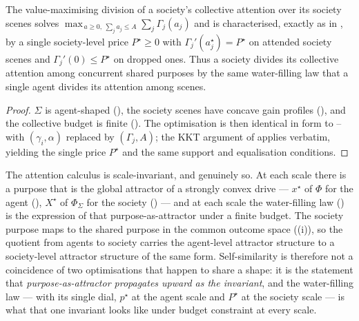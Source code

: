 \documentclass[11pt,twocolumn,a4paper]{article}
\newcommand{\drive}{\Phi}            %
\newcommand{\Purp}{x^{\star}}        %
\newcommand{\att}{\alpha}            %
\newcommand{\price}{p^{\star}}       %
\newcommand{\Soc}{\Sigma}            %
\begin{document}
\begin{theorem}
\label{thm:socwaterfill}
The value-maximising division of a society's collective attention over its
society scenes solves $\max_{\,a\ge0,\ \sum_j a_j\le A}\sum_j\Gamma_j(a_j)$
and is characterised, exactly as in , by a single
society-level price $P^\star\ge0$ with $\Gamma_j'(a_j^\star)=P^\star$ on
attended society scenes and $\Gamma_j'(0)\le P^\star$ on dropped ones.
Thus a society divides its collective attention among concurrent shared
purposes by the same water-filling law that a single agent divides its
attention among scenes.
\end{theorem}

\begin{proof}
$\Soc$ is agent-shaped (), the society scenes have
concave gain profiles (), and the collective budget is
finite (). The optimisation is then identical in form
to -- with $(\gamma_i,\att)$ replaced
by $(\Gamma_j,A)$; the KKT argument of  applies
verbatim, yielding the single price $P^\star$ and the same support and
equalisation conditions.
\end{proof}

\begin{corollary}
\label{cor:selfsim}
The attention calculus is scale-invariant, and genuinely so. At each scale
there is a purpose that is the global attractor of a strongly convex drive
--- $\Purp$ of $\drive$ for the agent (), $X^\star$ of
$\drive_\Soc$ for the society () --- and at each
scale the water-filling law () is the
expression of that purpose-as-attractor under a finite budget. The society
purpose maps to the shared purpose in the common outcome space
((i)), so the quotient from agents to society
carries the agent-level attractor structure to a society-level attractor
structure of the same form. Self-similarity is therefore not a coincidence
of two optimisations that happen to share a shape: it is the statement that
\emph{purpose-as-attractor propagates upward as the invariant}, and the
water-filling law --- with its single dial, $\price$ at the agent scale and
$P^\star$ at the society scale --- is what that one invariant looks like
under budget constraint at every scale.
\end{corollary}
\end{document}
